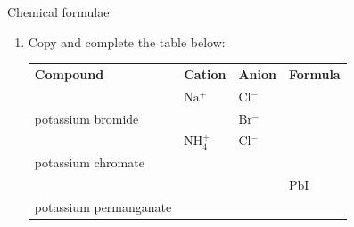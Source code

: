             \begin{exercises}{Chemical formulae
        }
            \nopagebreak
        \label{m38689*id145052}\begin{enumerate}[noitemsep, label=\textbf{\arabic*}. ] 
            \label{m38689*uid100}\item 
Copy and complete the table below:
          \begin{table}[H]
        \begin{center}
      \label{m38689*id145067}
    \noindent
      \tablelasttail{}
      \begin{xtabular}[t]{|l|l|l|l|}\hline
        \textbf{Compound} &
        \textbf{Cation} &
        \textbf{Anion} &
        \textbf{Formula}%
     \tabularnewline{}
         &
        $\mathrm{Na}{}^{+}$ &
        $\mathrm{Cl}{}^{-}$ &
     \tabularnewline{}
        potassium bromide &
         &
        $\mathrm{Br}{}^{-}$ &
     \tabularnewline{}
         &
        $\mathrm{NH}_{4}^{+}$ &
        $\mathrm{Cl}{}^{-}$ &
     \tabularnewline{}
        potassium chromate &
         &
         &
     \tabularnewline{}
         &
         &
         &
        $\mathrm{PbI}$%
     \tabularnewline{}
        potassium permanganate &
         &
         &
     \tabularnewline{}

\end{xtabular}
\end{center}
\end{table}
\end{enumerate}
\end{exercises}
